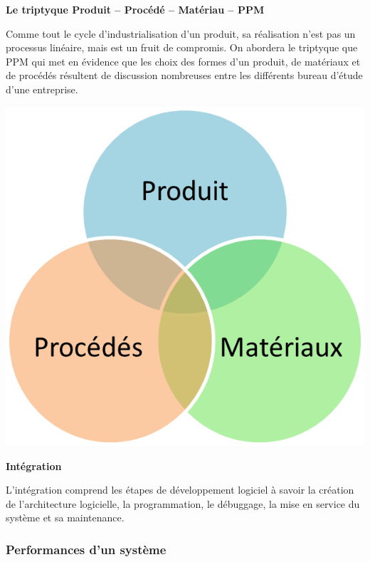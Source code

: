 \documentclass[11pt,oneside]{article}
\begin{document}
\begin{rem}
\textbf{Le triptyque Produit -- Procédé -- Matériau -- PPM}

\noindent\begin{minipage}[c]{.7\linewidth}
Comme tout le cycle d'industrialisation d'un produit, sa réalisation n'est pas un processus linéaire, mais est un fruit de compromis. On abordera le triptyque que PPM qui met en évidence que les choix des formes d'un produit, de matériaux et de procédés résultent de discussion nombreuses entre les différents bureau d'étude d'une entreprise. 
\end{minipage}\hfill
\begin{minipage}[c]{.25\linewidth}
\begin{center}
\includegraphics[width=.95\textwidth]{png/ppm}
\end{center}
\end{minipage}
\end{rem}

\begin{defi}
\textbf{Intégration}

L'intégration comprend les étapes de développement logiciel à savoir la création de l'architecture logicielle, la programmation, le débuggage, la mise en service du système et sa maintenance.
\end{defi}


\subsubsection{Performances d'un système}
\end{document}
